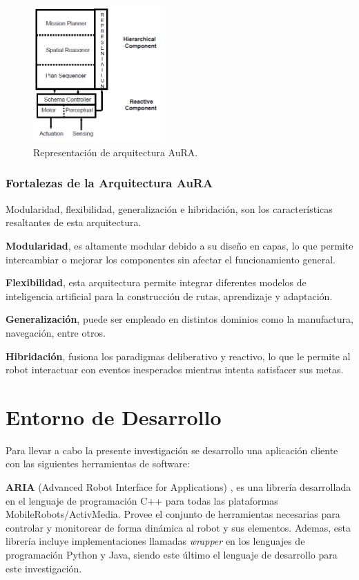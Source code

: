 \documentclass[11pt,twoside,A5]{article}
\begin{document}
\begin{figure}[here]
\begin{center}
\includegraphics[width=5cm]{aura.png} 
\caption{Representación de arquitectura AuRA.}
\label{fig:aura}
\end{center}
\end{figure} 

\subsubsection*{Fortalezas de la Arquitectura AuRA}

Modularidad, flexibilidad, generalización e hibridación, son los características resaltantes de esta arquitectura.

\textbf{Modularidad}, es altamente modular debido a su diseño en capas, lo que permite intercambiar o mejorar
los componentes sin afectar el funcionamiento general.

\textbf{Flexibilidad}, esta arquitectura permite integrar diferentes modelos de inteligencia artificial 
para la construcción de rutas, aprendizaje y adaptación. 

\textbf{Generalización}, puede ser empleado en distintos dominios como la manufactura, navegación, entre otros.

\textbf{Hibridación}, fusiona los paradigmas deliberativo y reactivo, lo que le permite al robot interactuar con eventos inesperados mientras intenta satisfacer sus metas.

\section*{Entorno de Desarrollo}

Para llevar a cabo la presente investigación se desarrollo una aplicación cliente
con las siguientes herramientas de software:

\textbf{ARIA} (Advanced Robot Interface for Applications) \cite{aria2014},
es una librería desarrollada en el lenguaje de programación C++ para todas las
plataformas MobileRobots/ActivMedia. Provee el conjunto de herramientas necesarias
para controlar y monitorear de forma dinámica al robot y sus elementos. Ademas, esta librería
incluye implementaciones llamadas \textit{wrapper} en los lenguajes de programación Python y Java, siendo este último 
el lenguaje de desarrollo para este investigación.
\end{document}
